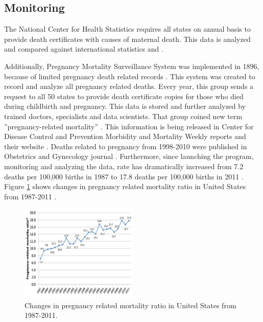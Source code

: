 \documentclass[sigconf]{acmart}
\begin{document}
\subsection{Monitoring}

The National Center for Health Statistics requires all states on annual basis to provide death certificates with causes of maternal death. This data is analyzed and compared against international statistics \cite{hoyert2007maternal} and \cite{creanga2014maternal}.

Additionally, Pregnancy Mortality Surveillance System was implemented in 1896, because of limited pregnancy death related records  \cite{horon2011effectiveness}. This system was created to record and analyze all pregnancy related deaths. Every year, this group sends a request to all 50 states to provide death certificate copies for those who died during childbirth and pregnancy. This data is stored and further analyzed by trained doctors, specialists and data scientists. That group coined new term ''pregnancy-related mortality'' \cite{callaghan2012overview}. This information is being released in Center for Disease Control and Prevention Morbidity and Mortality Weekly reports and their website \cite{neggers2016trends}. Deaths related to pregnancy from 1998-2010 were published in Obstetrics and Gynecology journal \cite{schulz1994assessing}. Furthermore, since launching the program, monitoring and analyzing the data, rate has dramatically increased from 7.2 deaths per 100,000 births in 1987 to 17.8 deaths per 100,000 births in 2011 \cite{neggers2016trends}. Figure \ref{fig:figure3} shows changes in pregnancy related mortality ratio in United States from 1987-2011 \cite{centers2014pregnancyrelated}.

\begin{figure}
  \centering
  \includegraphics[width=0.5\textwidth]{images/figure3.pdf}
  \caption{Changes in pregnancy related mortality ratio in United States from 1987-2011.} \label{fig:figure3} 
\end{figure}
\end{document}
